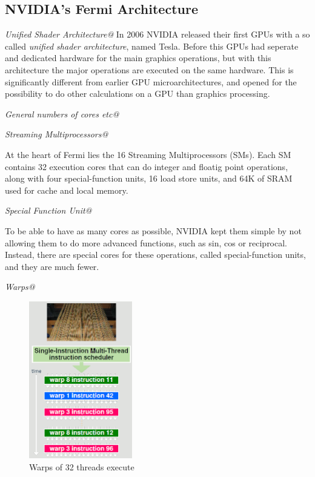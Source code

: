 \documentclass[../main/report.tex]{subfiles}
\begin{document}
\subsection{NVIDIA's Fermi Architecture} %


\emph{Unified Shader Architecture@}
In 2006 NVIDIA released their first GPUs with a so called \emph{unified shader architecture}, named Tesla.
Before this GPUs had seperate and dedicated hardware for the main graphics operations, 
but with this architecture the major operations are executed on the same hardware.
This is significantly different from earlier GPU microarchitectures, and opened
for the possibility to do other calculations on a GPU than graphics processing.


\emph{General numbers of cores etc@}


\emph{Streaming Multiprocessors@}

At the heart of Fermi lies the 16 Streaming Multiprocessors (SMs). 
Each SM contains 32 execution cores that can do integer and floatig point operations, 
along with four special-function units, 16 load store units, 
and 64K of SRAM used for cache and local memory.

\emph{Special Function Unit@}

To be able to have as many cores as possible, NVIDIA kept them simple by not allowing them to do more advanced functions, such as sin, cos or reciprocal.
Instead, there are special cores for these operations, called special-function units, and they are much fewer.

\emph{Warps@}

\begin{figure}[H]
\centering
\includegraphics[width=0.4\textwidth]{../introduction/assets/warp.png}
\caption{Warps of 32 threads execute }
\label{fig:simple-nvidia-warps}
\end{figure}
\end{document}

